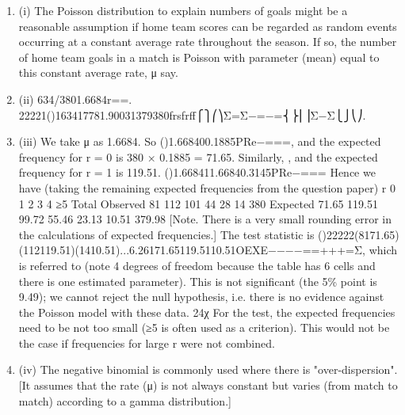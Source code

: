 \documentclass[a4paper,12pt]{article}
\begin{document}
\begin{enumerate}
    \item 
(i) The Poisson distribution to explain numbers of goals might be a reasonable assumption if home team scores can be regarded as random events occurring at a constant average rate throughout the season. If so, the number of home team goals in a match is Poisson with parameter (mean) equal to this constant average rate, μ say.
    \item  (ii) 634/3801.6684r==.
22221()163417781.90031379380frsfrff⎧⎫⎛⎞Σ=Σ−=−=⎨⎬⎜⎟Σ−Σ⎩⎭⎝⎠.
    \item  (iii) We take μ as 1.6684. So ()1.668400.1885PRe−===, and the expected frequency for r = 0 is 380 × 0.1885 = 71.65.
Similarly, , and the expected frequency for r = 1 is 119.51. ()1.668411.66840.3145PRe−===
Hence we have (taking the remaining expected frequencies from the question paper)
r
0
1
2
3
4
≥5
Total
Observed
81
112
101
44
28
14
380
Expected
71.65
119.51
99.72
55.46
23.13
10.51
379.98
[Note. There is a very small rounding error in the calculations of expected frequencies.]
The test statistic is
()22222(8171.65)(112119.51)(1410.51)...6.26171.65119.5110.51OEXE−−−−==+++=Σ,
which is referred to (note 4 degrees of freedom because the table has 6 cells and there is one estimated parameter). This is not significant (the 5\% point is 9.49); we cannot reject the null hypothesis, i.e. there is no evidence against the Poisson model with these data. 24χ
For the test, the expected frequencies need to be not too small (≥5 is often used as a criterion). This would not be the case if frequencies for large r were not combined.
    \item (iv) The negative binomial is commonly used where there is "over-dispersion". [It assumes that the rate (μ) is not always constant but varies (from match to match) according to a gamma distribution.]
\end{enumerate}
\end{document}

